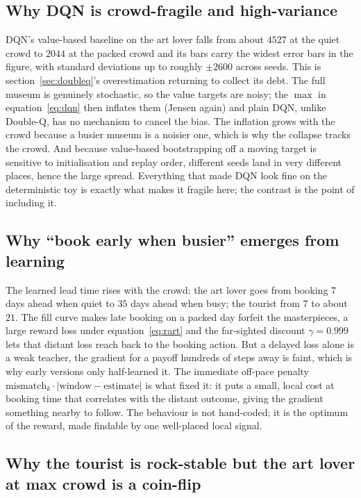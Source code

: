 \documentclass[11pt]{article}
\newcommand{\why}[1]{\textcolor{inkblue}{#1}}
\begin{document}
\subsection{Why DQN is crowd-fragile and high-variance}

DQN's value-based baseline on the art lover falls from about $4527$ at the quiet crowd to
$2044$ at the packed crowd and its bars carry the widest error bars in the figure, with
standard deviations up to roughly $\pm 2600$ across seeds. \why{This is section~\ref{sec:doubleq}'s
overestimation returning to collect its debt. The full museum is genuinely stochastic, so
the value targets are noisy; the $\max$ in equation~\eqref{eq:dqn} then inflates them
(Jensen again) and plain DQN, unlike Double-Q, has no mechanism to cancel the bias. The
inflation grows with the crowd because a busier museum is a noisier one, which is why the
collapse tracks the crowd. And because value-based bootstrapping off a moving target is
sensitive to initialisation and replay order, different seeds land in very different
places, hence the large spread.} Everything that made DQN look fine on the deterministic
toy is exactly what makes it fragile here; the contrast is the point of including it.

\subsection{Why ``book early when busier'' emerges from learning}

The learned lead time rises with the crowd: the art lover goes from booking $7$ days ahead
when quiet to $35$ days ahead when busy; the tourist from $7$ to about $21$. \why{The fill
curve makes late booking on a packed day forfeit the masterpieces, a large reward loss
under equation~\eqref{eq:rart} and the far-sighted discount $\gamma = 0.999$ lets that
distant loss reach back to the booking action. But a delayed loss alone is a weak teacher,
the gradient for a payoff hundreds of steps away is faint, which is why early versions only
half-learned it. The immediate off-pace penalty $\text{mismatch}_k\cdot|\text{window}-
\text{estimate}|$ is what fixed it: it puts a small, local cost at booking time that
correlates with the distant outcome, giving the gradient something nearby to follow.} The
behaviour is not hand-coded; it is the optimum of the reward, made findable by one
well-placed local signal.

\subsection{Why the tourist is rock-stable but the art lover at max crowd is a coin-flip}
\end{document}
